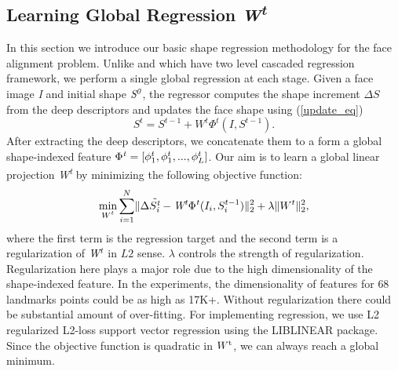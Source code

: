 \documentclass[10pt,twocolumn,letterpaper]{article}
\begin{document}
\subsection{Learning Global Regression \textit{W\textsuperscript{t}}}
\label{learn_regressor}

In this section we introduce our basic shape regression methodology for the face alignment problem. Unlike \cite{DBLP:journals/ijcv/CaoWWS14} and \cite{DBLP:conf/cvpr/RenCW014} which have two level cascaded regression framework, we perform a single global regression at each stage.
Given a face image \textit{I} and initial shape $\textit{S\textsuperscript{0}}$, the regressor computes the shape increment $\Delta S$ from the deep descriptors and updates the face shape using  (\ref{update_eq})
\begin{equation}
\label{update_eq}
 \textit{$S^{t} $} = \textit{$S^{t-1}$} + \textit{$W^t$}\Phi^{t}(\textit{I},\textit{$S^{t-1}$}).
\end{equation}
After extracting the deep descriptors, we concatenate them to a form a global shape-indexed feature $\Phi{\textsuperscript{\textit{t}}}=[\phi_1^t,\phi_1^t,...,\phi_L^t]$. Our aim is to learn a global linear projection
\textit{W\textsuperscript{t}} by minimizing the following objective function:
\begin{equation}
\label{objective_function}
 \underset {\textit{$W^t$}} \min \sum_{i=1}^{N} \lVert \Delta \tilde{S^\textit{t}_\textit{i}}-\textit{W\textsuperscript{t}} \Phi \textsuperscript{\textit{t}}(\textit{$I_{i}$},\textit{$S_i^{t-1} $})\rVert_2^2 + \lambda\lVert \textit{$W^t$}\rVert_2^2,
\end{equation}
where the first term is the regression target and the second term is a regularization of $\textit{W\textsuperscript{t}} $ in $L2$ sense. $ \lambda $ controls the strength of regularization. Regularization here plays a major role due to the high dimensionality of the shape-indexed feature. In the experiments, the dimensionality of features for $68$ landmarks points could be as high as 17K+. Without regularization there could be substantial amount of over-fitting.
For implementing regression, we use L2 regularized L2-loss support vector regression using the LIBLINEAR \cite{REF08a} package. Since the objective function is quadratic in $W\textsuperscript{t}$, we can always reach a global minimum.
\end{document}
